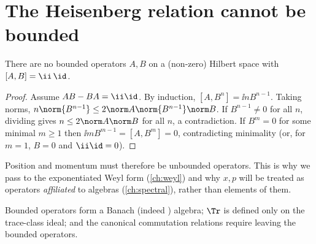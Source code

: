 \section{The Heisenberg relation cannot be bounded}

\begin{theorem}
There are no bounded operators $A,B$ on a (non-zero) Hilbert space with $[A,B]=\ii\,\id$.
\end{theorem}
\begin{proof}
Assume $AB-BA=\ii\id$. By induction, $[A,B^n]=\ii nB^{n-1}$. Taking norms, $n\norm{B^{n-1}}\le2\norm A\norm{B^{n-1}}\norm B$. If $B^{n-1}\neq0$ for all $n$, dividing gives $n\le2\norm A\norm B$ for all $n$, a contradiction. If $B^{m}=0$ for some minimal $m\ge1$ then $\ii m B^{m-1}=[A,B^m]=0$, contradicting minimality (or, for $m=1$, $B=0$ and $\ii\id=0$).
\end{proof}

Position and momentum must therefore be unbounded operators. This is why we pass to the exponentiated Weyl form (\cref{ch:weyl}) and why $x,p$ will be treated as operators \emph{affiliated} to algebras (\cref{ch:spectral}), rather than elements of them.

\begin{keyidea}
Bounded operators form a Banach (indeed \cstar) algebra; $\Tr$ is defined only on the trace-class ideal; and the canonical commutation relations require leaving the bounded operators.
\end{keyidea}

